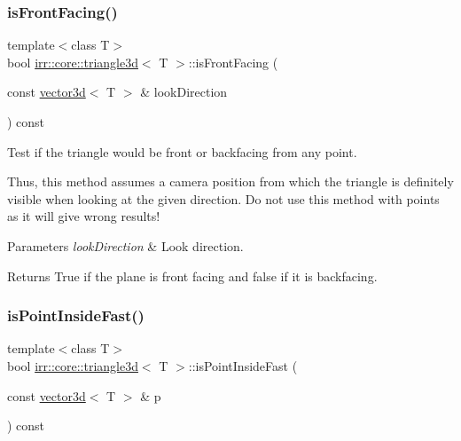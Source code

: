 \subsubsection{\texorpdfstring{is\+Front\+Facing()}{isFrontFacing()}\hspace{0.1cm}{\footnotesize\ttfamily [2/2]}}
{\footnotesize\ttfamily template$<$class T$>$ \\
bool \hyperlink{classirr_1_1core_1_1triangle3d}{irr\+::core\+::triangle3d}$<$ T $>$\+::is\+Front\+Facing (\begin{DoxyParamCaption}\item[{const \hyperlink{classirr_1_1core_1_1vector3d}{vector3d}$<$ T $>$ \&}]{look\+Direction }\end{DoxyParamCaption}) const\hspace{0.3cm}{\ttfamily [inline]}}



Test if the triangle would be front or backfacing from any point. 

Thus, this method assumes a camera position from which the triangle is definitely visible when looking at the given direction. Do not use this method with points as it will give wrong results! 
\begin{DoxyParams}{Parameters}
{\em look\+Direction} & Look direction. \\
\hline
\end{DoxyParams}
\begin{DoxyReturn}{Returns}
True if the plane is front facing and false if it is backfacing. 
\end{DoxyReturn}
\mbox{\label{classirr_1_1core_1_1triangle3d_a87d93ff616faf4b99b59f8d2ecd9c0de}} 
\subsubsection{\texorpdfstring{is\+Point\+Inside\+Fast()}{isPointInsideFast()}\hspace{0.1cm}{\footnotesize\ttfamily [1/2]}}
{\footnotesize\ttfamily template$<$class T$>$ \\
bool \hyperlink{classirr_1_1core_1_1triangle3d}{irr\+::core\+::triangle3d}$<$ T $>$\+::is\+Point\+Inside\+Fast (\begin{DoxyParamCaption}\item[{const \hyperlink{classirr_1_1core_1_1vector3d}{vector3d}$<$ T $>$ \&}]{p }\end{DoxyParamCaption}) const\hspace{0.3cm}{\ttfamily [inline]}}



